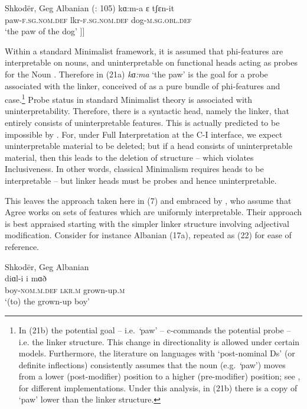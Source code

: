 \documentclass[output=paper]{langsci/langscibook}
\begin{document}
\ea%
    \label{ex:manzini:21}
    \ea Shkodër, Geg Albanian (\citealt{Manzini2011Reducing}: 105)
    \gll kɑ:m-a      ɛ          tʃɛn-it          \\
         paw-\textsc{f.sg.nom.def}   lkr-\textsc{f.sg.nom.def}  dog-\textsc{m.sg.obl.def} \\
    \glt ‘the paw of the dog’
    \ex\relax [\textsubscript{DP} kɑ:ma    [\textsubscript{Lkr} ɛ  [\textsubscript{DP} tʃɛnit ]]] 
    \z
\z{}

 Within a standard Minimalist framework, it is assumed that phi-features are interpretable on nouns, and uninterpretable on functional heads acting as probes for the Noun \citep{Carstens2001}. Therefore in (21a) \textit{kɑ:ma} ‘the paw’ is the goal for a probe associated with the linker, conceived of as a pure bundle of phi-features and case.\footnote{In (21b) the potential goal – i.e. \textit{‘}paw’ – c-commands the potential probe – i.e. the linker structure. This change in directionality is allowed under certain models. Furthermore, the literature on languages with ‘post-nominal Ds’ (or definite inflections) consistently assumes that the noun (e.g. \textit{‘}paw’) moves from a lower (post-modifier) position to a higher (pre-modifier) position; see \citet{Turano2002}, \citet{Dimitrova-Vulchanova1998} for different implementations. Under this analysis, in (21b) there is a copy of ‘paw’ lower than the linker structure.} Probe status in standard Minimalist theory is associated with uninterpretability. Therefore, there is a syntactic head, namely the linker, that entirely consists of uninterpretable features. This is actually predicted to be impossible by \citet{Chomsky1995}. For, under Full Interpretation at the C-I interface, we expect uninterpretable material to be deleted; but if a head consists of uninterpretable material, then this leads to the deletion of structure – which violates Inclusiveness. In other words, classical Minimalism requires heads to be interpretable – but linker heads must be probes and hence uninterpretable. 

  This leaves the approach taken here in (7) and embraced by \citet{Franco2015}, who assume that Agree works on sets of features which are uniformly interpretable. Their approach is best appraised starting with the simpler linker structure involving adjectival modification. Consider for instance Albanian (17a), repeated as (22) for ease of reference. 

\ea%
    Shkodër, Geg Albanian\label{ex:manzini:22}\\
    \gll diɑl-i       i   mɑð       \\
         boy-\textsc{nom.m.def}   \textsc{lkr.m}  grown-up.\textsc{m}  \\
    \glt ‘(to) the grown-up boy’ 
    \z
\end{document}
